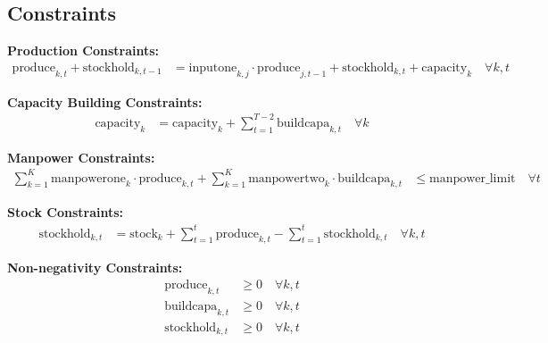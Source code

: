 \documentclass{article}
\begin{document}
\subsection*{Constraints}

\textbf{Production Constraints:}
\begin{align*}
\text{produce}_{k,t} + \text{stockhold}_{k,t-1} & = \text{inputone}_{k,j} \cdot \text{produce}_{j,t-1} + \text{stockhold}_{k,t} + \text{capacity}_{k} \quad \forall k, t
\end{align*}

\textbf{Capacity Building Constraints:}
\begin{align*}
\text{capacity}_{k} & = \text{capacity}_{k} + \sum_{t=1}^{T-2} \text{buildcapa}_{k,t} \quad \forall k
\end{align*}

\textbf{Manpower Constraints:}
\begin{align*}
\sum_{k=1}^{K} \text{manpowerone}_{k} \cdot \text{produce}_{k,t} + \sum_{k=1}^{K} \text{manpowertwo}_{k} \cdot \text{buildcapa}_{k,t} & \leq \text{manpower\_limit} \quad \forall t
\end{align*}

\textbf{Stock Constraints:}
\begin{align*}
\text{stockhold}_{k,t} & = \text{stock}_{k} + \sum_{t=1}^{t} \text{produce}_{k,t} - \sum_{t=1}^{t} \text{stockhold}_{k,t} \quad \forall k, t
\end{align*}

\textbf{Non-negativity Constraints:}
\begin{align*}
\text{produce}_{k,t} & \geq 0 \quad \forall k, t \\
\text{buildcapa}_{k,t} & \geq 0 \quad \forall k, t \\
\text{stockhold}_{k,t} & \geq 0 \quad \forall k, t
\end{align*}
\end{document}
